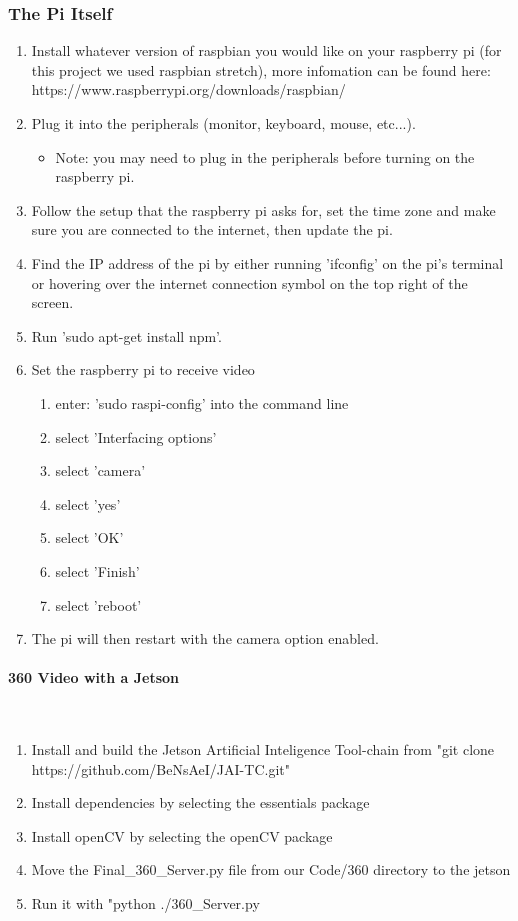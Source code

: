 \documentclass[onecolumn, draftclsnofoot,10pt, compsoc]{IEEEtran}
\begin{document}
\subsubsection{The Pi Itself}
\begin{enumerate}

\item Install whatever version of raspbian you would like on your raspberry pi (for this project we used raspbian stretch), more infomation can be found here:  https://www.raspberrypi.org/downloads/raspbian/
\item Plug it into the peripherals (monitor, keyboard, mouse, etc...).
\begin{itemize}
    \item Note: you may need to plug in the peripherals before turning on the raspberry pi.
\end{itemize}
\item Follow the setup that the raspberry pi asks for, set the time zone and make sure you are connected to the internet, then update the pi.
\item Find the IP address of the pi by either running 'ifconfig' on the pi's terminal or hovering over the internet connection symbol on the top right of the screen.
\item Run 'sudo apt-get install npm'.
\item Set the raspberry pi to receive video
\begin{enumerate}

    \item enter: 'sudo raspi-config' into the command line
    \item select 'Interfacing options'
    \item select 'camera'
    \item select 'yes'
    \item select 'OK'
    \item select 'Finish'
    \item select 'reboot' 
    \end{enumerate}

\item The pi will then restart with the camera option enabled. 
\end{enumerate}

\paragraph{360 Video with a Jetson} \\
\begin{enumerate}

\item Install and build the Jetson Artificial Inteligence Tool-chain from "git clone https://github.com/BeNsAeI/JAI-TC.git"
\item Install dependencies by selecting the essentials package 
\item Install openCV by selecting the openCV package
\item Move the Final\_360\_Server.py file from our Code/360 directory to the jetson
\item Run it with "python ./360\_Server.py
\end{enumerate}
\end{document}

